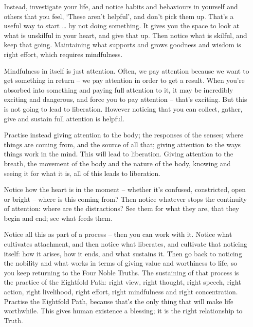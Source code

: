 Instead, investigate your life, and notice habits and
behaviours in yourself and others that you feel, `These aren't helpful',
and don't pick them up. That's a useful way to start \ldots{} by not doing
something. It gives you the space to look at what is unskilful in your heart,
and give that up. Then notice what is skilful, and keep that going. Maintaining
what supports and grows goodness and wisdom is right effort, which requires mindfulness.

Mindfulness in itself is just attention. Often, we pay attention because we want to get something in return -- we pay
attention in order to get a result. When you're absorbed into something and
paying full attention to it, it may be incredibly exciting and dangerous, and force
you to pay attention -- that's exciting. But this is not going to lead to
liberation. However noticing that you can collect, gather, give and sustain full attention is helpful. 

Practise instead giving attention to the body; the responses of the senses;
where things are coming from, and the source of all that; giving attention to the
ways things work in the mind. This will lead to liberation. Giving attention to
the breath, the movement of the body and the nature of the body, knowing and
seeing it for what it is, all of this leads to liberation.

Notice how the heart is in the moment -- whether it's confused, constricted,
open or bright -- where is this coming from? Then notice whatever stops
the continuity of attention: where are the distractions? See them for what they
are, that they begin and end; see what feeds them.

Notice all this as part of a process -- then you can work with it. Notice what
cultivates attachment, and then notice what liberates, and cultivate that
noticing itself: how it arises, how it ends, and what sustains it. Then go back
to noticing the nobility and what works in terms of giving value and worthiness to life, so you keep
returning to the Four Noble Truths. The sustaining of that process is the practice of the
Eightfold Path: right view, right thought, right speech, right action, right
livelihood, right effort, right mindfulness and right concentration. Practise
the Eightfold Path, because that's the only thing that will make life
worthwhile. This gives human existence a blessing; it is the right relationship
to Truth.

\enlargethispage{\baselineskip}

